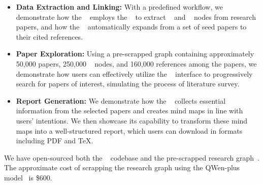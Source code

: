 \begin{itemize}
\item \textbf{Data Extraction and Linking:}
With a predefined workflow, we demonstrate how the \scrapper~ employs the \inspector~ to extract \fact~ and \dimension~ nodes from research papers, and how the \navigator~ automatically expands from a set of seed papers to their cited references.%

\item \textbf{Paper Exploration:}
Using a pre-scrapped graph containing approximately 50,000 papers, 250,000 \dimension~ nodes, and 160,000 references among the papers, we demonstrate how users can effectively utilize the \explorer~ interface to progressively search for papers of interest, simulating the process of literature survey. %

\item \textbf{Report Generation:}
We demonstrate how the \generator~ collects essential information from the selected papers and creates mind maps in line with users’ intentions. We then showcase its capability to transform these mind maps into a well-structured report, which users can download in formats including PDF and TeX.
\end{itemize}

We have open-sourced both the \sys~ codebase and the pre-scrapped research graph~\cite{opensource}.
The approximate cost of scrapping the research graph using the QWen-plus model~\cite{tongyi} is \$600.

